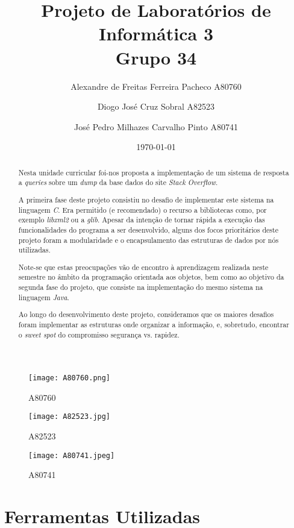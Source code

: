 \documentclass[10pt]{article}
\begin{document}
\title{Projeto de Laboratórios de Informática 3\\Grupo 34}
\author{Alexandre de Freitas Ferreira Pacheco A80760\and Diogo José Cruz Sobral A82523\and José Pedro Milhazes Carvalho Pinto A80741}


\date{\today}


\maketitle

\begin{figure}[h]
	\centering
		\texttt{[image: A80760.png]}
		\caption{A80760}
		\label{fig1:A80760}
	\endminipage\hfill
	\centering
		\texttt{[image: A82523.jpg]}
		\caption{A82523}
		\label{fig2:A82523}
	\endminipage\hfill
	\centering
		\texttt{[image: A80741.jpeg]}
		\caption{A80741}
		\label{fig3:A80741}
	\endminipage
\end{figure}


\begin{abstract}
		Nesta unidade curricular foi-nos proposta a implementação de um sistema
	de resposta a \textit{queries} sobre um \textit{dump} da  base dados do site
	 \emph{Stack Overflow}.
	
		A primeira fase deste projeto consistiu no desafio de implementar este
	sistema na linguagem \emph{C}. Era permitido (e recomendado) o recurso a
	bibliotecas como, por exemplo \textit{libxml2} ou a \textit{glib}.
	Apesar da intenção de tornar rápida a execução das funcionalidades do programa
	a ser desenvolvido, alguns dos focos prioritários deste projeto foram
	a modularidade e o encapsulamento das estruturas de dados por nós utilizadas.
	
		Note-se que estas preocupações vão de encontro à aprendizagem realizada 
	neste semestre no âmbito da programação orientada aos objetos, bem como ao
	objetivo da segunda fase do projeto, que consiste na implementação do mesmo
	sistema na linguagem \emph{Java}.

		Ao longo do desenvolvimento deste projeto, consideramos que os maiores 
	desafios foram implementar as estruturas onde organizar a informação, e, sobretudo, 
	encontrar o \textit{sweet spot} do compromisso segurança vs. rapidez.   
\end{abstract}

\pagebreak

\section{Ferramentas Utilizadas} 
\end{document}

